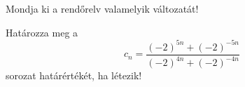\documentclass[11pt]{scrartcl}
\begin{document}
Mondja ki a rendőrelv valamelyik változatát!

Határozza meg a
\[
	c_n = \frac{(-2)^{5n} + (-2)^{-5n}}{(-2)^{4n} + (-2)^{-4n}}
\]
sorozat határértékét, ha létezik!
\end{document}
